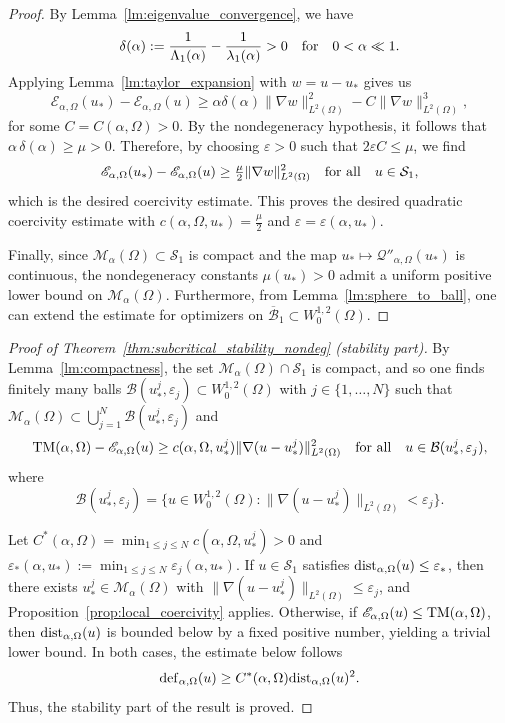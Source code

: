\documentclass[reqno,11pt]{amsart}
\theoremstyle{definition}
\begin{document}
\begin{proof}
By Lemma~\ref{lm:eigenvalue_convergence}, we have 
\[
\delta(\alpha):=\frac{1}{\Lambda_1(\alpha)}-\frac{1}{\lambda_1(\alpha)}>0 \quad {\rm for} \quad 0<\alpha\ll 1.
\]
Applying Lemma~\ref{lm:taylor_expansion} with $w=u-u_*$ gives us
\[
\mathscr{E}_{\alpha,\Omega}(u_*)-\mathscr{E}_{\alpha,\Omega}(u)
\geq 
\alpha\delta(\alpha)\|\nabla w\|_{L^2(\Omega)}^2 - C\|\nabla w\|_{L^2(\Omega)}^3,
\]
for some $C=C(\alpha, \Omega)>0$.
By the nondegeneracy hypothesis, it follows that $\alpha\,\delta(\alpha)\ge \mu>0$. 
Therefore, by choosing $\varepsilon>0$ such that $2\varepsilon C\le \mu$, we find
\[
\mathscr{E}_{\alpha,\Omega}(u_*)-\mathscr{E}_{\alpha,\Omega}(u)\ge \tfrac{\mu}{2}\|\nabla w\|_{L^2(\Omega)}^2 \quad {\rm for \ all} \quad u\in\mathcal{S}_1,
\]
which is the desired coercivity estimate.
This proves the desired quadratic coercivity estimate with 
$c(\alpha,\Omega,u_*)=\tfrac{\mu}{2}$ and $\varepsilon=\varepsilon(\alpha,u_*)$.

Finally, since $\mathcal{M}_\alpha(\Omega)\subset\mathcal{S}_1$ is compact and 
the map $u_*\mapsto \mathscr{Q}''_{\alpha,\Omega}(u_*)$ is continuous,
the nondegeneracy constants $\mu(u_*)>0$ admit a uniform positive lower bound on 
$\mathcal{M}_\alpha(\Omega)$. 
Furthermore, from Lemma~\ref{lm:sphere_to_ball}, one can extend the estimate for optimizers on $\overline{\mathcal{B}}_1\subset W^{1,2}_0(\Omega)$.
\end{proof}

\begin{proof}[Proof of Theorem~\ref{thm:subcritical_stability_nondeg} (stability part)]
By Lemma~\ref{lm:compactness}, the set $\mathcal{M}_\alpha(\Omega)\cap\mathcal{S}_1$ 
is compact, and so one finds finitely many balls $\mathcal{B}(u_*^j,\varepsilon_j)\subset W^{1,2}_0(\Omega)$ with $j\in\{1,\dots,N\}$ such that $\mathcal{M}_\alpha(\Omega)\subset \bigcup_{j =1}^N \mathcal{B}(u_*^j,\varepsilon_j)$ and
\[
    {\rm TM}(\alpha,\Omega)-\mathscr{E}_{\alpha,\Omega}(u)
\geq
c(\alpha,\Omega,u_*^j)\|\nabla(u-u_*^j)\|_{L^2(\Omega)}^2
\quad {\rm for \ all} \quad u\in\mathcal{B}(u_*^j,\varepsilon_j),
\]
where 
\[
\mathcal{B}(u_*^j,\varepsilon_j)=\{u\in W^{1,2}_0(\Omega) : \|\nabla(u- u_*^j)\|_{L^2(\Omega)}<\varepsilon_j\}.
\]

Let $C^*(\alpha,\Omega)=\min_{1\le j\le N} c(\alpha,\Omega,u_*^j)>0$ and $\varepsilon_*(\alpha,u_*):=\min_{1\le j\le N}\varepsilon_j(\alpha,u_*)$. 
If $u\in\mathcal{S}_1$ satisfies
${\rm dist}_{\alpha,\Omega}(u)\le \varepsilon_*$, 
then there exists $u_*^j\in\mathcal{M}_\alpha(\Omega)$ with $\|\nabla(u-u_*^j)\|_{L^2(\Omega)}\le \varepsilon_j$, 
and Proposition~\ref{prop:local_coercivity} applies. 
Otherwise, if $\mathscr{E}_{\alpha,\Omega}(u)\le{\rm TM}(\alpha,\Omega)$, then ${\rm dist}_{\alpha,\Omega}(u)$ is bounded below by a fixed positive number, yielding a trivial lower bound.
In both cases, the estimate below follows 
\[
{\rm def}_{\alpha,\Omega}(u) \ge C^*(\alpha,\Omega){\rm dist}_{\alpha,\Omega}(u)^2.
\]
Thus, the stability part of the result is proved.
\end{proof}
\end{document}
